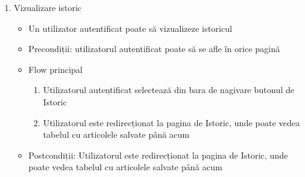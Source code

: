 \begin{enumerate}
    \item Vizualizare istoric
    \begin{itemize}
        \setlength\itemsep{0.5em}
        \item Un utilizator autentificat poate să vizualizeze istoricul
        \item Precondiții: utilizatorul autentificat poate să se afle în orice pagină
        \item Flow principal
        \begin{enumerate}
            \setlength\itemsep{0.5em}
            \item Utilizatorul autentificat selectează din bara de nagivare butonul de Istoric
            \item Utilizatorul este redirecționat la pagina de Istoric, unde poate vedea tabelul cu articolele salvate până acum
        \end{enumerate}
        \item Postcondiții: Utilizatorul este redirecționat la pagina de Istoric, unde poate vedea tabelul cu articolele salvate până acum
    \end{itemize}


\end{enumerate}
